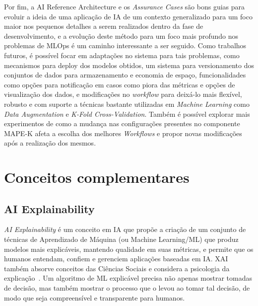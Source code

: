 \documentclass[portugues]{ic-tese}
\begin{document}
Por fim, a AI Reference Architecture e os \textit{Assurance Cases} são bons guias para evoluir a ideia de uma aplicação de IA de um contexto generalizado para um foco maior nos pequenos detalhes a serem realizados dentro da fase de desenvolvimento, e a evolução deste método para um foco mais profundo nos problemas de MLOps é um caminho interessante a ser seguido. Como trabalhos futuros, é possível focar em adaptações no sistema para tais problemas, como mecanismos para deploy dos modelos obtidos, um sistema para versionamento dos conjuntos de dados para armazenamento e economia de espaço, funcionalidades como opções para notificação em casos como piora das métricas e opções de visualização dos dados, e modificações no \textit{workflow} para deixá-lo mais flexível, robusto e com suporte a técnicas bastante utilizadas em \textit{Machine Learning} como \textit{Data Augmentation} e \textit{K-Fold Cross-Validation}. Também é possível explorar mais experimentos de como a mudança nas configurações presentes no componente MAPE-K afeta a escolha dos melhores \textit{Workflows} e propor novas modificações após a realização dos mesmos.




\appendix
\chapter{Conceitos complementares}

\section{AI Explainability}
\label{app:AIExplainability}

\textit{AI Explainability} é um conceito em IA que propõe a criação de um conjunto de técnicas de Aprendizado de Máquina (ou Machine Learning/ML) que produz modelos mais explicáveis, mantendo qualidade em suas métricas, e permite que os humanos entendam, confiem e gerenciem aplicações baseadas em IA. XAI também absorve conceitos das Ciências Sociais e considera a psicologia da explicação~\citep{Arrieta_2020}. Um algoritmo de ML explicável precisa não apenas mostrar tomadas de decisão, mas também mostrar o processo que o levou ao tomar tal decisão, de modo que seja compreensível e transparente para humanos.
\end{document}
